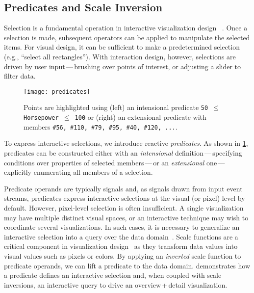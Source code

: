 \vspace{-10pt}

\subsection{Predicates and Scale Inversion}

\vspace{-10pt}

Selection is a fundamental operation in interactive visualization design~
\cite{heer:generalized}. Once a selection is made, subsequent operators can be
applied to manipulate the selected items. For visual design, it can be
sufficient to make a predetermined selection (e.g., ``select all rectangles'').
With interaction design, however, selections are driven by user
input\,---\,brushing over points of interest, or adjusting a slider to filter
data.

\begin{figure}[t!]
  \centering
  \texttt{[image: predicates]}
  \caption{Points are highlighted using (left) an intensional predicate
  \texttt{50 $\leq$ Horsepower $\leq$ 100} or (right) an extensional predicate
  with members \texttt{\#56, \#110, \#79, \#95, \#40, \#120, ...}.}
  \label{fig:vg:predicates}
\end{figure}

To express interactive selections, we introduce reactive \emph{predicates}. As
shown in \cref{fig:vg:predicates}, predicates can be constructed either with an
\emph{intensional} definition\,---\,specifying conditions over properties of
selected members\,---\,or an \emph{extensional} one\,---\,explicitly enumerating
all members of a selection.

Predicate operands are typically signals and, as signals drawn from input event
streams, predicates express interactive selections at the visual (or pixel)
level by default. However, pixel-level selection is often insufficient. A single
visualization may have multiple distinct visual spaces, or an interactive
technique may wish to coordinate several visualizations. In such cases, it is
necessary to generalize an interactive selection into a query over the data
domain~\cite{heer:generalized}. Scale functions are a critical component in
visualization design~ \cite{wilkinson:grammar} as they transform data values
into visual values such as pixels or colors. By applying an \emph{inverted}
scale function to predicate operands, we can lift a predicate to the data
domain.  demonstrates how a predicate defines an
interactive selection and, when coupled with scale inversions, an interactive
query to drive an overview\,+\,detail visualization.

